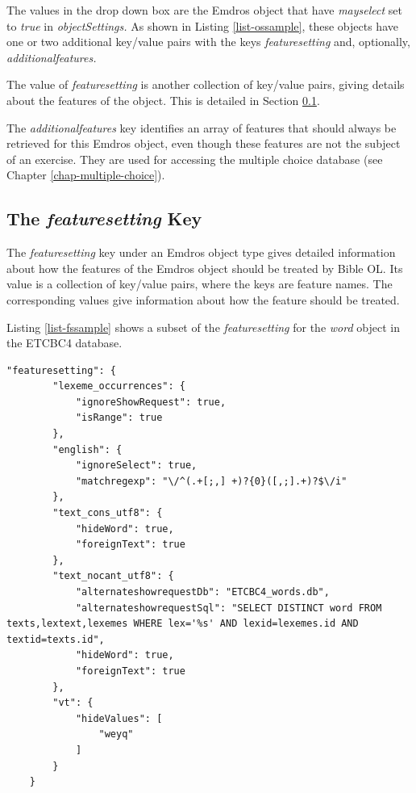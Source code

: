 \documentclass[11pt,oneside,a4paper]{memoir}
\begin{document}
The values in the drop down box are the Emdros object that have \emph{mayselect} set to \emph{true}
in \emph{objectSettings.} As shown in Listing \ref{list-ossample}, these objects have one or
two additional key/value pairs with the keys \emph{featuresetting} and, optionally,
\emph{additionalfeatures.}

The value of \emph{featuresetting} is another collection of key/value pairs, giving
details about the features of the object. This is detailed in Section \ref{sec-featuresetting}.

The \emph{additionalfeatures} key identifies an array of features that should always be retrieved
for this Emdros object, even though these features are not the subject of an exercise. They are used
for accessing the multiple choice database (see Chapter \ref{chap-multiple-choice}).

\subsection{The \emph{featuresetting} Key}\label{sec-featuresetting}

The \emph{featuresetting} key under an Emdros object type gives detailed information about how the
features of the Emdros object should be treated by Bible OL. Its value is a collection of key/value
pairs, where the keys are feature names. The corresponding values give
information about how the feature should be treated.

Listing \ref{list-fssample} shows a subset of the \emph{featuresetting} for the \emph{word} object
in the ETCBC4 database.

\begin{lstlisting}[escapechar=\#,caption=A sample featuresetting value,label=list-fssample]
    "featuresetting": {
        "lexeme_occurrences": {
            "ignoreShowRequest": true,
            "isRange": true
        },
        "english": {
            "ignoreSelect": true,
            "matchregexp": "\/^(.+[;,] +)?{0}([,;].+)?$\/i"
        },
        "text_cons_utf8": {
            "hideWord": true,
            "foreignText": true
        },
        "text_nocant_utf8": {
            "alternateshowrequestDb": "ETCBC4_words.db",
            "alternateshowrequestSql": "SELECT DISTINCT word FROM texts,lextext,lexemes WHERE lex='%s' AND lexid=lexemes.id AND textid=texts.id",
            "hideWord": true,
            "foreignText": true
        },
        "vt": {
            "hideValues": [
                "weyq"
            ]
        }
    }
\end{lstlisting}
\end{document}
